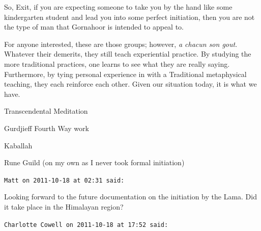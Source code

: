 \begin{footnotesize}
\begin{sffamily}
So, Exit, if you are expecting someone to take you by the hand like some kindergarten student and lead you into some perfect initiation, then you are not the type of man that Gornahoor is intended to appeal to.

For anyone interested, these are those groups; however, \emph{a chacun son gout}. Whatever their demerits, they still teach experiential practice. By studying the more traditional practices, one learns to see what they are really saying. Furthermore, by tying personal experience in with a Traditional metaphysical teaching, they each reinforce each other. Given our situation today, it is what we have.

Transcendental Meditation

Gurdjieff Fourth Way work

Kaballah

Rune Guild (on my own as I never took formal initiation)

\hfill

\texttt{Matt on 2011-10-18 at 02:31 said:}

Looking forward to the future documentation on the initiation by the Lama. Did it take place in the Himalayan region?

\hfill

\texttt{Charlotte Cowell on 2011-10-18 at 17:52 said:}


\end{sffamily}
\end{footnotesize}
